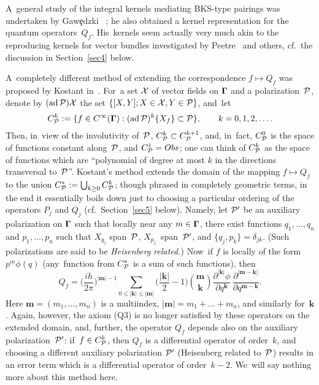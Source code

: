 \documentclass[12pt]{amsart}
\numberwithin{equation}{section}
\theoremstyle{remark}
\let\boldkey\mathbf \let\bold\mathbf
\newcommand\Obs{Obs}
\newcommand\Omg{{\bigam}}   %
\newcommand\XXX{{\Cal X}}     \newcommand\xX{\XXX}
\newcommand\PP{{\Cal P}}
\newcommand\GG{{\PP'}}
\newcommand\ad{\operatorname{ad}}
\newcommand{\bigam}{\mbox{\boldmath $\Gamma$}}
\begin{document}
A~general study of the integral kernels mediating BKS-type pairings was
undertaken by Gaw\c{e}dzki \cite{bib:GaweD}~\cite{bib:GaweGSPM}; he also
obtained a kernel representation for the quantum operators~$Q_f$. His~kernels
seem actually very much akin to the reproducing kernels for vector bundles
investigated by Peetre~\cite{bib:Pee} and others, cf.~the discussion in
Section~\ref{sec4} below.

A~completely different method of extending the correspondence $f\mapsto Q_f$
was proposed by Kostant in~\cite{bib:KostSymp}. For~a set $\XXX$ of vector
fields on $\Omg$ and a polarization~$\PP$, denote by $(\ad\PP)\XXX$ the set
$\{[X,Y]; X\in\XXX, Y\in\PP\}$, and~let
$$ C_\PP^k := \{ f\in C^\infty(\Omg): (\ad\PP)^k\{X_f\}\subset\PP\},
\qquad k=0,1,2,\dots.   $$
Then, in~view of the involutivity of~$\PP$, $C^k_\PP\subset C^{k+1}_\PP$, and,
in~fact, $C^0_\PP$ is the space of functions constant along~$\PP$, and
$C^1_\PP=\Obs$; one can think of $C^k_\PP$ as the space of functions which are
``polynomial of degree at most $k$ in the directions transversal to~$\PP$''.
Kostant's method extends the domain of the mapping $f\mapsto Q_f$ to the union
$C^*_\PP:= \bigcup_{k\ge0} C^k_\PP$; though phrased in completely geometric
terms, in the end it essentially boils down just to choosing a particular
ordering of the operators $P_j$ and $Q_j$ (cf.~Section~\ref{sec5} below).
Namely, let $\GG$ be an auxiliary polarization on $\Omg$ such that locally near
any $m\in \Omg$, there exist functions $q_1,\dots,q_n$ and $p_1,\dots,p_n$ such
that $X_{q_j}$ span~$\PP$, $X_{p_j}$~span~$\GG$, and $\{q_j,p_k\}=\delta_{jk}$.
(Such polarizations are said to be {\it Heisenberg related.\/}) Now~if $f$ is
locally of the form $p^m \phi(q)$ (any~function from $C^*_\PP$ is a sum of such
functions), then
$$ Q_f = \bigg(\frac{ih}{2\pi}\bigg)^{|\boldkey m|-1} \sum_{0\le|\boldkey k|\le
|\boldkey m|} \bigg(\frac{|\boldkey k|}2-1\bigg) \binom{\boldkey m}{\boldkey k}
\frac{\partial^{|\boldkey k|}\phi} {\partial q^{\boldkey k}} \, \frac
{\partial^{|\boldkey m-\boldkey k|}}{\partial q^{\boldkey m-\boldkey k}}.  $$
Here $\boldkey m=(m_1,\dots,m_n)$ is a multiindex, $|\boldkey m|=m_1+\dots+
m_n$, and similarly for~$\boldkey k$. Again, however, the axiom (Q3) is no
longer satisfied by these operators on the extended domain, and, further, the
operator $Q_f$ depends also on the auxiliary polarization~$\GG$: if~$f\in
C^k_\PP$, then $Q_f$ is a differential operator of order~$k$, and choosing a
different auxiliary polarization $\GG$ (Heisenberg related to~$\PP$) results in
an error term which is a differential operator of order~$k-2$. We~will say
nothing more about this method here.
\end{document}
